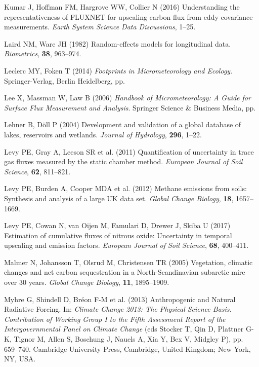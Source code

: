 \hypertarget{ref-Kumar2016}{}
Kumar J, Hoffman FM, Hargrove WW, Collier N (2016) Understanding the
representativeness of FLUXNET for upscaling carbon flux from eddy
covariance measurements. \emph{Earth System Science Data Discussions},
1--25.

\hypertarget{ref-Laird1982}{}
Laird NM, Ware JH (1982) Random-effects models for longitudinal data.
\emph{Biometrics}, \textbf{38}, 963--974.

\hypertarget{ref-Leclerc2014}{}
Leclerc MY, Foken T (2014) \emph{\textup{Footprints in Micrometeorology
and Ecology}}. Springer-Verlag, Berlin Heidelberg, pp.

\hypertarget{ref-Lee2006}{}
Lee X, Massman W, Law B (2006) \emph{\textup{Handbook of
Micrometeorology: A Guide for Surface Flux Measurement and Analysis}}.
Springer Science \& Business Media, pp.

\hypertarget{ref-Lehner2004}{}
Lehner B, Döll P (2004) Development and validation of a global database
of lakes, reservoirs and wetlands. \emph{Journal of Hydrology},
\textbf{296}, 1--22.

\hypertarget{ref-Levy2011}{}
Levy PE, Gray A, Leeson SR et al. (2011) Quantification of uncertainty
in trace gas fluxes measured by the static chamber method.
\emph{European Journal of Soil Science}, \textbf{62}, 811--821.

\hypertarget{ref-Levy2012}{}
Levy PE, Burden A, Cooper MDA et al. (2012) Methane emissions from
soils: Synthesis and analysis of a large UK data set. \emph{Global
Change Biology}, \textbf{18}, 1657--1669.

\hypertarget{ref-Levy2017}{}
Levy PE, Cowan N, van Oijen M, Famulari D, Drewer J, Skiba U (2017)
Estimation of cumulative fluxes of nitrous oxide: Uncertainty in
temporal upscaling and emission factors. \emph{European Journal of Soil
Science}, \textbf{68}, 400--411.

\hypertarget{ref-Malmer2005}{}
Malmer N, Johansson T, Olsrud M, Christensen TR (2005) Vegetation,
climatic changes and net carbon sequestration in a North-Scandinavian
subarctic mire over 30 years. \emph{Global Change Biology}, \textbf{11},
1895--1909.

\hypertarget{ref-Myhre2013}{}
Myhre G, Shindell D, Bréon F-M et al. (2013) Anthropogenic and Natural
Radiative Forcing. In: \emph{Climate Change 2013: The Physical Science
Basis. Contribution of Working Group I to the Fifth Assessment Report of
the Intergovernmental Panel on Climate Change} (eds Stocker T, Qin D,
Plattner G-K, Tignor M, Allen S, Boschung J, Nauels A, Xia Y, Bex V,
Midgley P), pp. 659--740. Cambridge University Press, Cambridge, United
Kingdom; New York, NY, USA.

